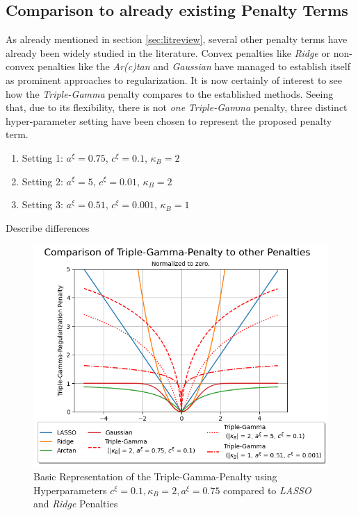 \documentclass[12pt,a4paper]{article}
\newenvironment{lightbluebox}{%
    \begin{tcolorbox}[colback=lightblue, colframe=lightblue, fontupper=\itshape]%
}{%
    \end{tcolorbox}%
}
\begin{document}
\newpage

\subsection{Comparison to already existing Penalty Terms}\label{subsec:comparepenalties}

As already mentioned in section \ref{sec:litreview}, several other penalty terms have already been widely studied in the literature. Convex penalties like \textit{Ridge} \parencite{HoerlKennard1970a} or non-convex penalties like the \textit{Ar(c)tan} \parencite{WangZhu2016} and \textit{Gaussian} \parencite{JohnVettamWu2022} have managed to establish itself as prominent approaches to regularization. It is now certainly of interest to see how the \textit{Triple-Gamma} penalty compares to the established methods. Seeing that, due to its flexibility, there is not \textit{one} \textit{Triple-Gamma} penalty, three distinct hyper-parameter setting have been chosen to represent the proposed penalty term. 
\begin{enumerate}
\item Setting 1: \quad $a^\xi=0.75$, $c^\xi=0.1$, $\kappa_B = 2$
\item Setting 2: \quad $a^\xi=5$, $c^\xi=0.01$, $\kappa_B = 2$
\item Setting 3: \quad $a^\xi=0.51$, $c^\xi=0.001$, $\kappa_B = 1$
\end{enumerate}

\begin{lightbluebox}
Describe differences
\end{lightbluebox}

\begin{figure}[!h]
\centering
\includegraphics[scale=0.75]{../02_simulation/021_simulation_figures/TGPenalty_Comparison.png}
\caption{Basic Representation of the Triple-Gamma-Penalty using Hyperparameters $c^\xi = 0.1, \kappa_B = 2, a^\xi = 0.75$ compared to \textit{LASSO} and \textit{Ridge} Penalties}
\label{fig:DifferentPenalties}
\end{figure}
\end{document}
